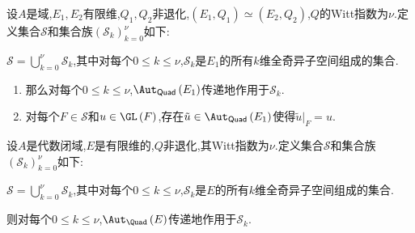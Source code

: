 \begin{corollary}{}{}
	设$A$是域,$E_{1},E_{2}$有限维,$Q_{1},Q_{2}$非退化,$\left(E_{1},Q_{1}\right)\simeq\left(E_{2},Q_{2}\right)$,$Q$的Witt指数为$\nu$.定义集合$\mathcal{S}$和集合族$\left(\mathcal{S}_{k}\right)_{k=0}^{\nu}$如下:
	\begin{center}
		$\mathcal{S}=\bigcup\limits_{k=0}^{\nu}\mathcal{S}_{k}$,其中对每个$0\leq k\leq\nu$,$\mathcal{S}_{k}$是$E_{1}$的所有$k$维全奇异子空间组成的集合.
	\end{center}
	\begin{enumerate}
		\item 那么对每个$0\leq k\leq\nu$,$\Aut_{\mathsf{Quad}}\left(E_{1}\right)$传递地作用于$\mathcal{S}_{k}$.
		\item 对每个$F\in\mathcal{S}$和$u\in\GL\left(F\right)$,存在$\tilde{u}\in\Aut_{\mathsf{Quad}}\left(E_{1}\right)$使得$\tilde{u}|_{F}=u$.
	\end{enumerate}
\end{corollary}

\begin{corollary}{}{}
	设$A$是代数闭域,$E$是有限维的,$Q$非退化,其Witt指数为$\nu$.定义集合$\mathcal{S}$和集合族$\left(\mathcal{S}_{k}\right)_{k=0}^{\nu}$如下:
	\begin{center}
		$\mathcal{S}=\bigcup\limits_{k=0}^{\nu}\mathcal{S}_{k}$,其中对每个$0\leq k\leq\nu$,$\mathcal{S}_{k}$是$E$的所有$k$维全奇异子空间组成的集合.
	\end{center}
	则对每个$0\leq k\leq\nu$,$\Aut_{\Quad}\left(E\right)$传递地作用于$\mathcal{S}_{k}$.
\end{corollary}